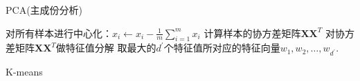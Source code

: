 \documentclass{article}
\begin{document}
	
	\begin{algorithm}
		\renewcommand{\thealgocf}{3-1}
		\renewcommand{\algorithmcfname}{降维算法}
		\caption{PCA(主成份分析)}
		对所有样本进行中心化：$ x_{i}\leftarrow x_{i}-\frac{1}{m}\sum_{i=1}^{m}x_{i} $\;
		计算样本的协方差矩阵$ \textbf{X}\textbf{X}^{T} $\;
		对协方差矩阵$ \textbf{X}\textbf{X}^{T} $做特征值分解\;
		取最大的$ d^{'} $个特征值所对应的特征向量$ w_{1},w_{2},\ldots,w_{d^{'}} $.
	\end{algorithm}

	\begin{algorithm}
		\renewcommand{\thealgocf}{4-1}
		\renewcommand{\algorithmcfname}{聚类算法}
		\caption{K-means}
	\end{algorithm}
\end{document}
